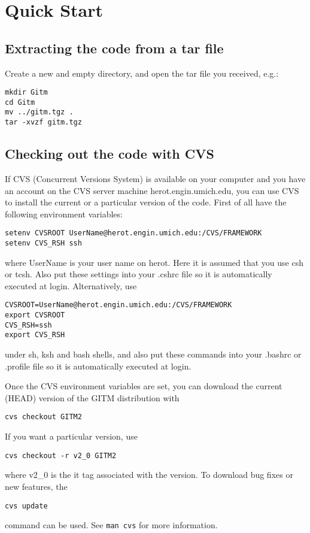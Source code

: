 
\section{Quick Start}

\subsection{Extracting the code from a tar file}

Create a new and empty directory, and open the tar file you received,
e.g.:
\begin{verbatim}
mkdir Gitm 
cd Gitm 
mv ../gitm.tgz . 
tar -xvzf gitm.tgz 
\end{verbatim}

\subsection{Checking out the code with CVS}

If CVS (Concurrent Versions System) is available on your computer and
you have an account on the CVS server machine herot.engin.umich.edu,
you can use CVS to install the current or a particular version of the
code. First of all have the following environment variables:
\begin{verbatim}
setenv CVSROOT UserName@herot.engin.umich.edu:/CVS/FRAMEWORK
setenv CVS_RSH ssh
\end{verbatim}
where UserName is your user name on herot. Here it is assumed that you
use csh or tcsh. Also put these settings into your .cshrc file so it
is automatically executed at login. Alternatively, use
\begin{verbatim}
CVSROOT=UserName@herot.engin.umich.edu:/CVS/FRAMEWORK 
export CVSROOT 
CVS_RSH=ssh 
export CVS_RSH
\end{verbatim}
under sh, ksh and bash shells, and also put these commands into your
.bashrc or .profile file so it is automatically executed at login.

Once the CVS environment variables are set, you can download the
current (HEAD) version of the GITM distribution with
\begin{verbatim}
cvs checkout GITM2
\end{verbatim}

If you want a particular version, use
\begin{verbatim}
cvs checkout -r v2_0 GITM2
\end{verbatim}
where v2\_0 is the it tag associated with the version. To download bug
fixes or new features, the
\begin{verbatim}
cvs update 
\end{verbatim}
command can be used. See {\tt man cvs} for more information.

